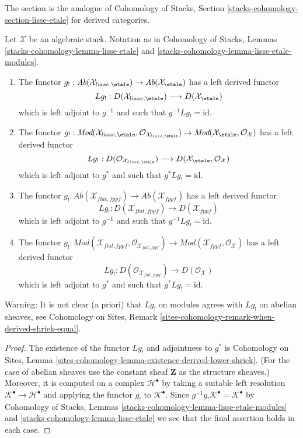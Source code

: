 \noindent
The section is the analogue of
Cohomology of Stacks, Section \ref{stacks-cohomology-section-lisse-etale}
for derived categories.

\begin{lemma}
\label{lemma-shriek-derived}
Let $\mathcal{X}$ be an algebraic stack.
Notation as in
Cohomology of Stacks,
Lemmas \ref{stacks-cohomology-lemma-lisse-etale} and
\ref{stacks-cohomology-lemma-lisse-etale-modules}.
\begin{enumerate}
\item The functor
$g_! : \textit{Ab}(\mathcal{X}_{lisse,\etale}) \to
\textit{Ab}(\mathcal{X}_\etale)$
has a left derived functor
$$
Lg_! :
D(\mathcal{X}_{lisse,\etale})
\longrightarrow
D(\mathcal{X}_\etale)
$$
which is left adjoint to $g^{-1}$ and such that $g^{-1}Lg_! = \text{id}$.
\item The functor $g_! : 
\textit{Mod}(\mathcal{X}_{lisse,\etale},
\mathcal{O}_{\mathcal{X}_{lisse,\etale}}) \to
\textit{Mod}(\mathcal{X}_\etale, \mathcal{O}_{\mathcal{X}})$
has a left derived functor
$$
Lg_! :
D(\mathcal{O}_{\mathcal{X}_{lisse,\etale}})
\longrightarrow
D(\mathcal{X}_\etale, \mathcal{O}_\mathcal{X})
$$
which is left adjoint to $g^*$ and such that $g^*Lg_! = \text{id}$.
\item The functor $g_! : \textit{Ab}(\mathcal{X}_{flat,fppf}) \to
\textit{Ab}(\mathcal{X}_{fppf})$
has a left derived functor
$$
Lg_! :
D(\mathcal{X}_{flat, fppf})
\longrightarrow
D(\mathcal{X}_{fppf})
$$
which is left adjoint to $g^{-1}$ and such that $g^{-1}Lg_! = \text{id}$.
\item The functor $g_! :
\textit{Mod}(\mathcal{X}_{flat,fppf},
\mathcal{O}_{\mathcal{X}_{flat,fppf}}) \to
\textit{Mod}(\mathcal{X}_{fppf}, \mathcal{O}_{\mathcal{X}})$
has a left derived functor
$$
Lg_! :
D(\mathcal{O}_{\mathcal{X}_{flat, fppf}})
\longrightarrow
D(\mathcal{O}_\mathcal{X})
$$
which is left adjoint to $g^*$ and such that $g^*Lg_! = \text{id}$.
\end{enumerate}
Warning: It is not clear (a priori) that $Lg_!$ on modules agrees
with $Lg_!$ on abelian sheaves, see
Cohomology on Sites, Remark
\ref{sites-cohomology-remark-when-derived-shriek-equal}.
\end{lemma}

\begin{proof}
The existence of the functor $Lg_!$ and adjointness to $g^*$ is
Cohomology on Sites, Lemma
\ref{sites-cohomology-lemma-existence-derived-lower-shriek}.
(For the case of abelian sheaves use the constant sheaf $\mathbf{Z}$
as the structure sheaves.)
Moreover, it is computed on a complex $\mathcal{H}^\bullet$
by taking a suitable left resolution
$\mathcal{K}^\bullet \to \mathcal{H}^\bullet$
and applying the functor $g_!$ to $\mathcal{K}^\bullet$.
Since $g^{-1}g_!\mathcal{K}^\bullet = \mathcal{K}^\bullet$ by
Cohomology of Stacks,
Lemmas \ref{stacks-cohomology-lemma-lisse-etale-modules} and
\ref{stacks-cohomology-lemma-lisse-etale}
we see that the final assertion holds in each case.
\end{proof}

